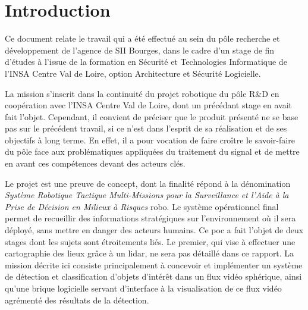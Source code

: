 \section*{Introduction}
{}
	
	Ce document relate le travail qui a été effectué au sein du pôle recherche et développement de l'agence de SII Bourges, dans le cadre d'un stage de fin d'études à l'issue de la formation en Sécurité et Technologies Informatique de l'INSA Centre Val de Loire, option Architecture et Sécurité Logicielle.
	
	La mission s'inscrit dans la continuité du projet robotique du pôle R\&D en coopération avec l'INSA Centre Val de Loire, dont un précédant stage en avait fait l'objet. Cependant, il convient de préciser que le produit présenté ne se base pas sur le précédent travail, si ce n'est dans l'esprit de sa réalisation et de ses objectifs à long terme. En effet, il a pour vocation de faire croître le savoir-faire du pôle face aux problématiques appliquées du traitement du signal et de mettre en avant ces compétences devant des acteurs clés.
	
	Le projet est une preuve de concept, dont la finalité répond à la dénomination \emph{Système Robotique Tactique Multi-Missions pour la Surveillance et l'Aide à la Prise de Décision en Milieux à Risques} \gls{robo}. Le système opérationnel final permet de recueillir des informations stratégiques sur l'environnement où il sera déployé, sans mettre en danger des acteurs humains. Ce \gls{poc} a fait l'objet de deux stages dont les sujets sont étroitements liés. Le premier, qui vise à effectuer une cartographie des lieux grâce à un \gls{lidar}, ne sera pas détaillé dans ce rapport. La mission décrite ici consiste principalement à concevoir et implémenter un système de détection et classification d'objets d'intérêt dans un flux vidéo sphérique, ainsi qu'une brique logicielle servant d'interface à la visualisation de ce flux vidéo agrémenté des résultats de la détection.
	
